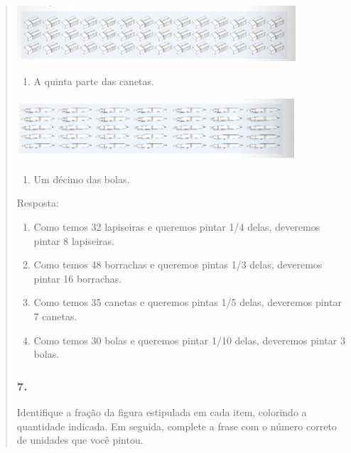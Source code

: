 \begin{enumerate}
\begin{escolha}
\begin{enumerate}
\begin{itemize}
\begin{itemize}
\begin{escolha}
\begin{quote}
\begin{escolha}
{\includegraphics[width=4.08369in,height=0.81674in]{media/image112.png}


\begin{enumerate}
\def\labelenumi{\alph{enumi})}
\item
  A quinta parte das canetas.
\end{enumerate}

\includegraphics[width=4.06702in,height=0.89174in]{media/image113.png}


\begin{enumerate}
\def\labelenumi{\alph{enumi})}
\item
  Um décimo das bolas.
\end{enumerate}


Resposta:

\begin{enumerate}
\def\labelenumi{\alph{enumi})}
\item
  Como temos 32 lapiseiras e queremos pintar 1/4 delas, deveremos pintar 8
  lapiseiras.
\item
  Como temos 48 borrachas e queremos pintas 1/3 delas, deveremos pintar
  16 borrachas.
\item
  Como temos 35 canetas e queremos pintas 1/5 delas, deveremos pintar 7
  canetas.
\item
  Como temos 30 bolas e queremos pintar 1/10 delas, deveremos pintar 3
  bolas.
\end{enumerate}

\subsubsection{7. }\label{section-110}

Identifique a fração da figura estipulada em cada item, colorindo a
quantidade indicada. Em seguida, complete a frase com o número correto de
unidades que você pintou.

}
\end{escolha}
\end{quote}
\end{escolha}
\end{itemize}
\end{itemize}
\end{enumerate}
\end{escolha}
\end{enumerate}
